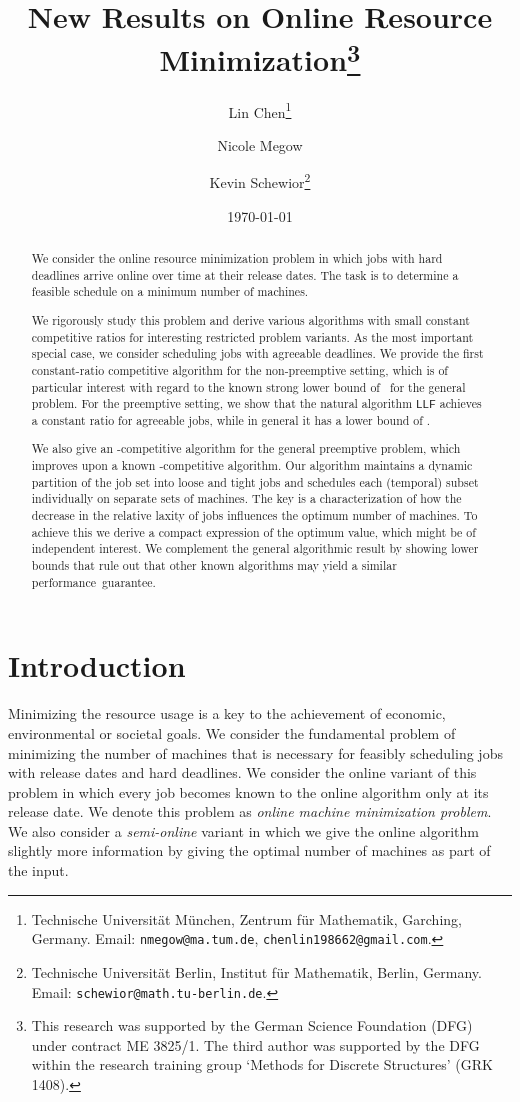 \documentclass[letterpaper,11pt]{article}
\title{New Results on Online Resource Minimization\thanks{This research was supported by the
    German Science Foundation (DFG) under contract  ME 3825/1. The
    third author was supported by the DFG within the research
    training group `Methods for Discrete Structures' (GRK 1408).}}
\author{
Lin Chen\thanks{Technische Universit\"at M\"unchen, Zentrum
   f\"ur Mathematik, Garching, Germany. Email:
   \texttt{nmegow@ma.tum.de}, \texttt{chenlin198662@gmail.com}.}
 \and Nicole Megow\footnotemark[2]  \and Kevin Schewior\thanks{Technische Universit\"at Berlin, Institut f\"ur
  Mathematik, Berlin, Germany. Email:
  \texttt{schewior@math.tu-berlin.de}.}}
\date{\today}
\newcommand{\LLF}{\ensuremath{\mathsf{LLF}}\xspace}
\begin{document}
\maketitle
\thispagestyle{empty}

\begin{abstract}
We consider the online resource minimization problem in which jobs
with hard deadlines arrive online over time at their release
dates. The task is to determine a feasible schedule on a minimum
number of machines. 

We rigorously study this problem and derive various algorithms with small constant competitive ratios for interesting restricted problem variants. As the most important special case, we consider scheduling jobs with
agreeable deadlines. We provide the first constant-ratio competitive
algorithm for the non-preemptive setting, which is of particular
interest with regard to the known strong lower bound of~ for the
general problem. For the preemptive setting, we show that the natural
algorithm \LLF achieves a constant ratio for agreeable jobs, while in general it has a lower bound of .

We also give an -competitive algorithm for the general preemptive problem, which improves upon a known -competitive algorithm. Our algorithm maintains a dynamic partition of the job set into loose and tight jobs and schedules each (temporal) subset individually on separate sets of machines. The key is a characterization of how the decrease in the relative laxity of jobs influences the optimum number of machines. To achieve this we derive  a compact expression of the optimum value, which might be of independent interest. We complement the general algorithmic result by showing lower bounds that rule out that other known algorithms may yield a similar performance~guarantee.

\end{abstract}

\clearpage
\setcounter{page}{1}

\section{Introduction} Minimizing the resource usage is a key  to the
achievement of economic, environmental or societal goals.
We consider the fundamental problem of minimizing the number of
machines that is necessary for feasibly scheduling jobs with
release dates and hard deadlines. We consider the online variant of this problem in which every job
becomes known to the online algorithm only at its release date. We
denote this problem as {\em online machine minimization problem}. We also
consider a {\em semi-online} variant in which we give the
online algorithm slightly more information by giving the optimal
number of machines as part of the input.
\end{document}

